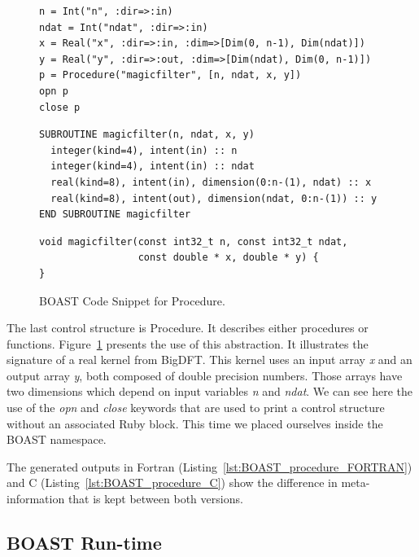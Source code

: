 \documentclass{IEEEtran}
\begin{document}
\begin{figure}
\begin{lstlisting}
n = Int("n", :dir=>:in)
ndat = Int("ndat", :dir=>:in)
x = Real("x", :dir=>:in, :dim=>[Dim(0, n-1), Dim(ndat)])
y = Real("y", :dir=>:out, :dim=>[Dim(ndat), Dim(0, n-1)])
p = Procedure("magicfilter", [n, ndat, x, y])
opn p
close p
\end{lstlisting}


\begin{lstlisting}
SUBROUTINE magicfilter(n, ndat, x, y)
  integer(kind=4), intent(in) :: n
  integer(kind=4), intent(in) :: ndat
  real(kind=8), intent(in), dimension(0:n-(1), ndat) :: x
  real(kind=8), intent(out), dimension(ndat, 0:n-(1)) :: y
END SUBROUTINE magicfilter
\end{lstlisting}

\begin{lstlisting}
void magicfilter(const int32_t n, const int32_t ndat,
                 const double * x, double * y) {
}
\end{lstlisting}
\caption{BOAST Code Snippet for Procedure.}
\label{fig:BOAST_procedure}
\end{figure}

The last control structure is Procedure. It describes either procedures or
functions. Figure~\ref{fig:BOAST_procedure} presents the use of this
abstraction. It illustrates the signature of a real kernel from BigDFT. This
kernel uses an input array \emph{x} and an output array \emph{y}, both composed
of double precision numbers. Those arrays have two dimensions which depend on
input variables \emph{n} and \emph{ndat}. We can see here the use of the
\emph{opn} and \emph{close} keywords that are used to print a control structure
without an associated Ruby block. This time we placed ourselves inside the
BOAST namespace.

The generated outputs in Fortran (Listing~\ref{lst:BOAST_procedure_FORTRAN})
and C (Listing~\ref{lst:BOAST_procedure_C}) show the difference in
meta-information that is kept between both versions.
  
\subsection{BOAST Run-time}
\end{document}

